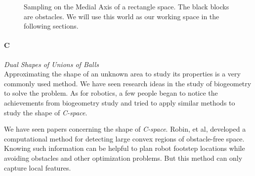 \documentclass[11pt]{article}
\begin{document}
\begin{figure}
	\caption{\label{fig:Medial Axis} Sampling on the Medial Axis of a rectangle space. The black blocks are obstacles. We will use this world as our working space in the following sections. }
\end{figure}


\paragraph{C} \emph{Dual Shapes of Unions of Balls} \hfill\\
\indent Approximating the shape of an unknown area to study its properties is a very commonly used method. We have seen research ideas in the study of biogeometry to solve the problem. As for robotics, a few people began to notice the achievements from biogeometry study and tried to apply similar methods to study the shape of \emph{C-space}. \cite{alpha intro} 

\indent We have seen papers concerning the shape of \emph{C-space}. Robin, et al, developed a computational method for detecting large convex regions of obstacle-free space\cite{largeconvex}. Knowing such information can be helpful to plan robot footstep locations while avoiding obstacles and other optimization problems. But this method can only capture local features.
\end{document}
